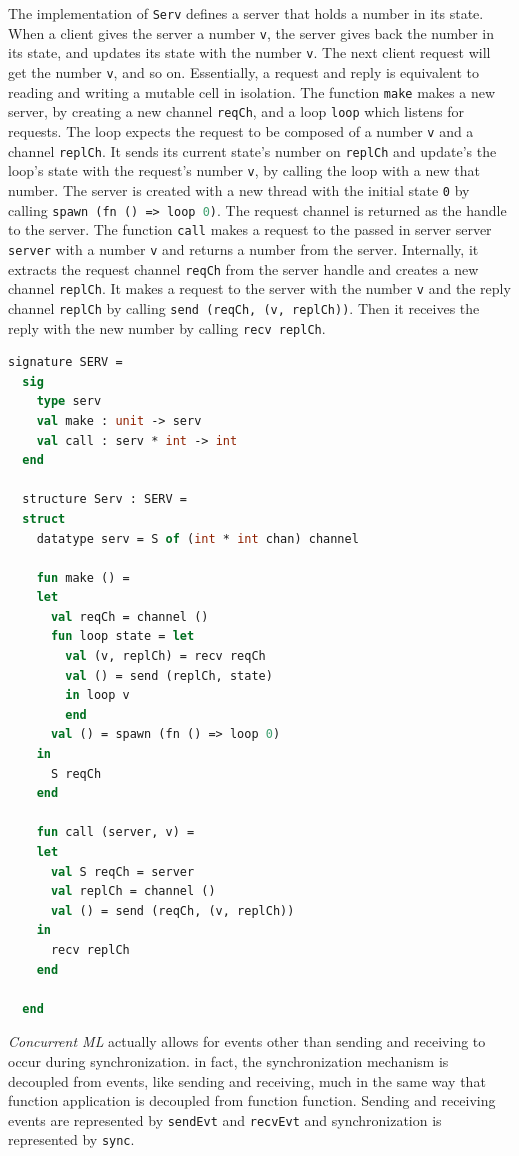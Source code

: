 \documentclass[10pt]{article}
\begin{document}
The implementation of \lstinline{Serv} defines a server that holds a number in its state.
When a client gives the server a number \lstinline{v}, the server gives back the number in
its state, and updates its state with the number \lstinline{v}.  The next client request will
get the number \lstinline{v}, and so on. Essentially, a request and reply is equivalent
to reading and writing a mutable cell in isolation. The function \lstinline{make} makes a new
server, by creating a new channel \lstinline{reqCh}, and a loop \lstinline{loop} which listens
for requests. The loop expects the request to be composed of a number \lstinline{v} and a
channel \lstinline{replCh}. It sends its current state's number on \lstinline{replCh} and
update's the loop's state with the request's number \lstinline{v}, by calling the loop with a
new that number. The server is created with a new thread with the initial state \lstinline{0}
by calling \lstinline[language=ML]{spawn (fn () => loop 0)}. The request channel is returned
as the handle to the server.  The function \lstinline{call} makes a request to the passed in
server server \lstinline{server} with a number \lstinline{v} and returns a number from the
server. Internally, it extracts the request channel \lstinline{reqCh} from the
server handle and creates a new channel \lstinline{replCh}. It makes a request to the server
with the number \lstinline{v} and the reply channel \lstinline{replCh} by calling
\lstinline{send (reqCh, (v, replCh))}. Then it receives the reply with the new number by
calling \lstinline{recv replCh}.


\begin{lstlisting}[language=ML, mathescape]
  signature SERV =
  sig 
    type serv
    val make : unit -> serv
    val call : serv * int -> int
  end

  structure Serv : SERV =
  struct 
    datatype serv = S of (int * int chan) channel 

    fun make () =
    let 
      val reqCh = channel ()
      fun loop state = let
        val (v, replCh) = recv reqCh
        val () = send (replCh, state)
        in loop v
        end
      val () = spawn (fn () => loop 0)
    in
      S reqCh
    end 

    fun call (server, v) =
    let 
      val S reqCh = server
      val replCh = channel () 
      val () = send (reqCh, (v, replCh))
    in
      recv replCh
    end

  end
\end{lstlisting}


\textit{Concurrent ML} actually allows for events other than sending and receiving to
occur during synchronization. in fact, the synchronization mechanism is decoupled from
events, like sending and receiving, much in the same way that function application is decoupled
from function function. Sending and receiving events are represented by \lstinline{sendEvt}
and \lstinline{recvEvt} and synchronization is represented by \lstinline{sync}.
\end{document}
